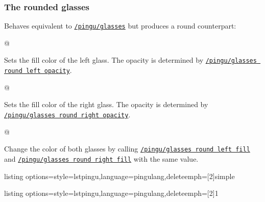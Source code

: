 \documentclass[parskip=half,english,numbers=noenddot,footnotes=nomultiple,oneside]{scrartcl}
\def\lpingu#1{\lstinline[style=lstpingu,language=pingulang]'#1'}
\newcommand*\keyref[2][/pingu/]{\hyperref[pk:#1#2]{\lpingu{#1#2}}}
\begin{document}
\subsubsection{The rounded glasses}

Behaves equivalent to \keyref{glasses} but produces a round counterpart:
\begin{tcblisting}{@}
\begin{tikzpicture}
	\pingu[glasses round=green]
\end{tikzpicture}
\end{tcblisting}
\endshowkeyexplain

	Sets the fill color of the left glass. The opacity is determined by \keyref{glasses round left opacity}.
\begin{tcblisting}{@}
\begin{tikzpicture}
	\pingu[glasses round,
	       glasses round left fill=green]
\end{tikzpicture}
\end{tcblisting}
\endsubkeyexplain

	Sets the fill color of the right glass. The opacity is determined by \keyref{glasses round right opacity}.
\begin{tcblisting}{@}
\begin{tikzpicture}
	\pingu[glasses round,
		  glasses round right fill=green]
\end{tikzpicture}
\end{tcblisting}
\endsubkeyexplain

	Change the color of both glasses by calling \keyref{glasses round left fill} and \keyref{glasses round right fill} with the same value.
\begin{tcblisting}{listing options={style=lstpingu,language=pingulang,deleteemph={[2]{simple}}}}
\begin{tikzpicture}
	\pingu[glasses round, glasses round fill=green]
\end{tikzpicture}
\end{tcblisting}
\endsubkeyexplain

\begin{tcblisting}{listing options={style=lstpingu,language=pingulang,deleteemph={[2]{1}}}}
\begin{tikzpicture}
	\pingu[glasses round,
			 glasses round left fill=green,
			 glasses round left opacity=1]
\end{tikzpicture}
\end{tcblisting}
\endsubkeyexplain
\end{document}
